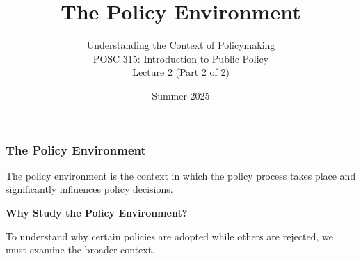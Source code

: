 \documentclass[10pt]{beamer}
\begin{document}
\title{The Policy Environment}
\subtitle{Understanding the Context of Policymaking\\POSC 315: Introduction to Public Policy\\Lecture 2 (Part 2 of 2)}
\date{Summer 2025}

\maketitle

\begin{frame}
\frametitle{The Policy Environment}

\begin{block}{}
\centering
The policy environment is the context in which the policy process takes place and significantly influences policy decisions.
\end{block}

\pause
\vspace{0.5cm}
\textbf{Why Study the Policy Environment?}

To understand why certain policies are adopted while others are rejected, we must examine the broader context.

\end{frame}
\end{document}
